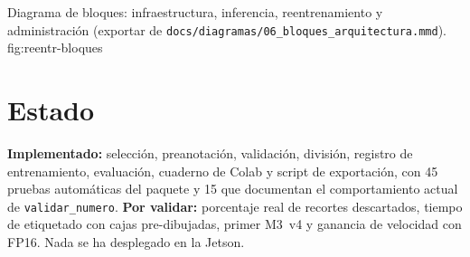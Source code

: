  {Diagrama de bloques: infraestructura, inferencia, reentrenamiento y
   administración (exportar de
   \texttt{docs/diagramas/06\_bloques\_arquitectura.mmd}).}
  {fig:reentr-bloques}

\section{Estado}

\begin{nota}
\textbf{Implementado:} selección, preanotación, validación, división,
registro de entrenamiento, evaluación, cuaderno de Colab y script de
exportación, con 45 pruebas automáticas del paquete y 15 que documentan
el comportamiento actual de \texttt{validar\_numero}. \textbf{Por validar:} porcentaje
real de recortes descartados, tiempo de etiquetado con cajas
pre-dibujadas, primer M3~v4 y ganancia de velocidad con FP16. Nada se ha
desplegado en la Jetson.
\end{nota}
